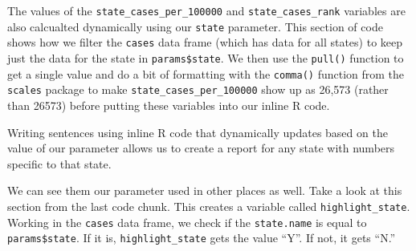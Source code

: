 \documentclass[
]{book}
\newenvironment{Shaded}{\begin{snugshade}}{\end{snugshade}}
\newcommand{\AttributeTok}[1]{\textcolor[rgb]{0.77,0.63,0.00}{#1}}
\newcommand{\FunctionTok}[1]{\textcolor[rgb]{0.00,0.00,0.00}{#1}}
\newcommand{\NormalTok}[1]{#1}
\newcommand{\OtherTok}[1]{\textcolor[rgb]{0.56,0.35,0.01}{#1}}
\newcommand{\SpecialCharTok}[1]{\textcolor[rgb]{0.00,0.00,0.00}{#1}}
\newcommand{\StringTok}[1]{\textcolor[rgb]{0.31,0.60,0.02}{#1}}
\begin{document}
The values of the \texttt{state\_cases\_per\_100000} and \texttt{state\_cases\_rank} variables are also calcualted dynamically using our \texttt{state} parameter. This section of code shows how we filter the \texttt{cases} data frame (which has data for all states) to keep just the data for the state in \texttt{params\$state}. We then use the \texttt{pull()} function to get a single value and do a bit of formatting with the \texttt{comma()} function from the \texttt{scales} package to make \texttt{state\_cases\_per\_100000} show up as 26,573 (rather than 26573) before putting these variables into our inline R code.

\begin{Shaded}
\end{Shaded}

Writing sentences using inline R code that dynamically updates based on the value of our parameter allows us to create a report for any state with numbers specific to that state.

We can see them our parameter used in other places as well. Take a look at this section from the last code chunk. This creates a variable called \texttt{highlight\_state}. Working in the \texttt{cases} data frame, we check if the \texttt{state.name} is equal to \texttt{params\$state}. If it is, \texttt{highlight\_state} gets the value ``Y''. If not, it gets ``N.''

\begin{Shaded}
\end{Shaded}
\end{document}
